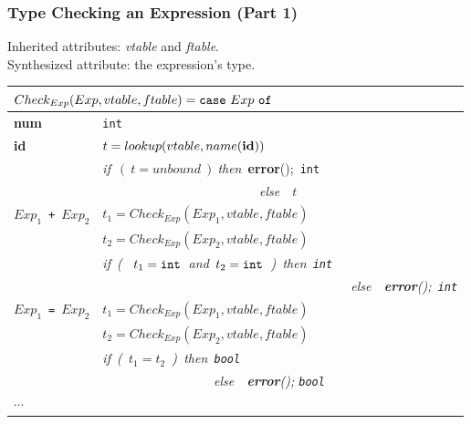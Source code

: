 \documentclass{beamer}
\newcommand{\emp}[1]{\textcolor{DikuRed}{ #1}}
\begin{document}
\begin{frame}
\frametitle{Type Checking an Expression (Part 1)}

\emp{Inherited attributes: {\em vtable} and {\em ftable}.}\\
\emp{Synthesized attribute: the expression's type.}

\bigskip

\renewcommand{\arraystretch}{0.9}
\begin{tabular}{|l|l|}\hline
\multicolumn{2}{|l|}{$ Check_{Exp}(Exp,vtable,ftable) =
  \mbox{\tt case}~Exp~\mbox{\tt of}$} \\\hline

{\bf num} & {\tt int} \\\hline

{\bf id}
        & $t = lookup(vtable,name(\mbox{\bf id}))$ \\
        & {\em if}~$(~t = unbound~)~${\em then}~\alert{{\bf error}();~\mbox{\tt int}}  \\
        & {\em~~~~~~~~~~~~~~~~~~~~~~~~else}~~$t$ \\\hline

$Exp_1$~{\tt +}~$Exp_2$
        & $t_1 = Check_{Exp}(Exp_1,vtable,ftable)$ \\
        & $t_2 = Check_{Exp}(Exp_2,vtable,ftable)$ \\
        & {\em if~(~ $t_1 = \mbox{\tt int}$~and~$t_2 = \mbox{\tt int}$~)~}{\em then~\mbox{\tt int}}\\
        & {\em ~~~~~~~~~~~~~~~~~~~~~~~~~~~~~~~~~~~~~~else~~\alert{{\mbox{\bf error}}();~{\tt int}}} \\\hline

$Exp_1$~{\tt =}~$Exp_2$
        & $t_1 = Check_{Exp}(Exp_1,vtable,ftable)$ \\
        & $t_2 = Check_{Exp}(Exp_2,vtable,ftable)$ \\
        & {\em if~(~$t_1 = t_2$~)~}{\em then~\mbox{\tt bool}} \\
        & {\em ~~~~~~~~~~~~~~~~~else~~\alert{{\mbox{\bf error}}(); {\tt bool}}} \\\hline


$\cdots$ & \\\hline

\end{tabular}

\end{frame}
\end{document}

